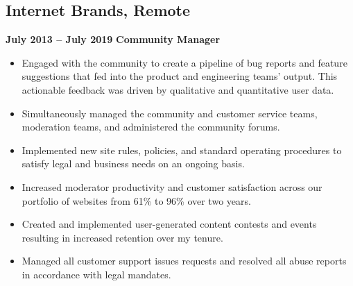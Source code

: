\documentclass[a4paper,9pt]{article}
\begin{document}
\subsection{Internet Brands, Remote} \hfill \textbf{July 2013 – July 2019}
\textbf{Community Manager}
\begin{itemize}[leftmargin=1em, itemsep=0pt, parsep=0pt]
    \item Engaged with the community to create a pipeline of bug reports and
          feature suggestions that fed into the product and engineering teams' output.
          This actionable feedback was driven by qualitative and quantitative user data.
    \item Simultaneously managed the community and customer service teams,
          moderation teams, and administered the community forums.
    \item Implemented new site rules, policies, and standard operating
          procedures to satisfy legal and business needs on an ongoing basis.
    \item Increased moderator productivity and customer satisfaction across our
          portfolio of websites from 61\% to 96\% over two years.
    \item Created and implemented user-generated content contests and events
          resulting in increased retention over my tenure.
    \item Managed all customer support issues requests and resolved all abuse
          reports in accordance with legal mandates.
\end{itemize}
\end{document}
